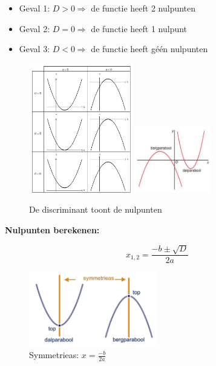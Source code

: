 \documentclass{article}
\begin{document}
\begin{itemize}
    \item Geval 1: $D > 0 \Rightarrow$ de functie heeft 2 nulpunten
    \item Geval 2: $D = 0 \Rightarrow$ de functie heeft 1 nulpunt
    \item Geval 3: $D < 0 \Rightarrow$ de functie heeft géén nulpunten
\end{itemize}

\begin{figure}[H]
    \centering
    \includegraphics[width=0.4\textwidth]{functie-2degraad3.png}
    \includegraphics[width=0.3\textwidth]{functie-2degraad2.png}
    \caption{De discriminant toont de nulpunten}
\end{figure}

\textbf{Nulpunten berekenen:} 

\begin{equation}
    x_{1,2} = \frac{-b \pm \sqrt{D}}{2a}
\end{equation}

\begin{figure}[H]
    \centering
    \includegraphics[width=0.5\textwidth]{functie-2degraad4.png}
    \caption{Symmetrieas: $x = \frac{-b}{2a}$}
\end{figure}
\end{document}
